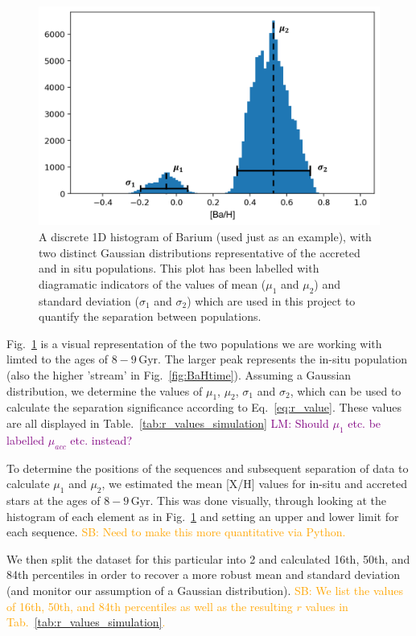 \documentclass[fleqn,usenatbib]{mnras}
\newcommand{\LM}[1]{{\textcolor{purple}{LM: #1}}}
\newcommand{\SB}[1]{{\textcolor{orange}{SB: #1}}}
\begin{document}
\begin{figure}
	\includegraphics[width=\columnwidth]{figures/hist_labelled.png}
    \caption{A discrete 1D histogram of Barium (used just as an example), with two distinct Gaussian distributions representative of the accreted and in situ populations. This plot has been labelled with diagramatic indicators of the values of mean ($\mu_1$ and $\mu_2$) and standard deviation ($\sigma_1$ and $\sigma_2$) which are used in this project to quantify the separation between populations.}
    \label{fig:hist_labels}
\end{figure}

Fig.~\ref{fig:hist_labels} is a visual representation of the two populations we are working with limted to the ages of $8-9\,\mathrm{Gyr}$. The larger peak represents the in-situ population (also the higher 'stream' in Fig.~\ref{fig:BaHtime}). Assuming a Gaussian distribution, we determine the values of $\mu_1$, $\mu_2$, $\sigma_1$ and $\sigma_2$, which can be used to calculate the separation significance according to Eq.~\ref{eq:r_value}. These values are all displayed in Table.~\ref{tab:r_values_simulation}
\LM{Should $\mu_1$ etc. be labelled $\mu_{acc}$ etc. instead?}

To determine the positions of the sequences and subsequent separation of data to calculate $\mu_1$ and $\mu_2$, we estimated the mean [X/H] values for in-situ and accreted stars at the ages of $8-9\,\mathrm{Gyr}$. This was done visually, through looking at the histogram of each element as in Fig.~\ref{fig:hist_labels} and setting an upper and lower limit for each sequence. \SB{Need to make this more quantitative via Python.}

We then split the dataset for this particular into 2 and calculated 16th, 50th, and 84th percentiles in order to recover a more robust mean and standard deviation (and monitor our assumption of a Gaussian distribution).
\SB{We list the values of 16th, 50th, and 84th percentiles as well as the resulting $r$ values in Tab.~\ref{tab:r_values_simulation}.}
\end{document}
